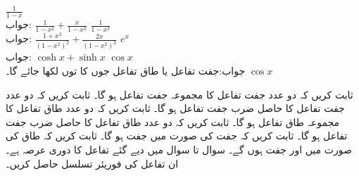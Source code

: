 \quad
$\tfrac{1}{1-x}$\\
جواب:\quad
$\tfrac{1}{1-x^2}+\tfrac{x}{1-x^2}$
$\tfrac{1}{1-x^2}$\\
جواب:\quad
$\frac{1+x^2}{(1-x^2)^2}+\frac{2x}{(1-x^2)^2}$
\quad 
$e^x$\\
جواب:\quad
$\cosh x+\sinh x$
\quad
$\cos x$\\
جواب:\quad جفت تفاعل یا طاق تفاعل جوں کا توں لکھا جائے گا۔\quad
$\cos x$

\quad 
ثابت کریں کہ دو عدد جفت تفاعل کا مجموعہ جفت تفاعل ہو گا۔
\quad 
ثابت کریں کہ دو عدد جفت تفاعل کا حاصل ضرب جفت تفاعل ہو گا۔
\quad 
ثابت کریں کہ دو عدد طاق تفاعل کا مجموعہ طاق تفاعل ہو گا۔
\quad 
ثابت کریں کہ دو عدد طاق تفاعل کا حاصل ضرب جفت تفاعل ہو گا۔
\quad
ثابت کریں کہ جفت  کی صورت میں  جفت ہو گا۔
\quad
ثابت کریں کہ طاق  کی صورت میں  اور  جفت ہوں گے۔
سوال  تا سوال  میں دیے گئے تفاعل کا دوری عرصہ  ہے۔ان تفاعل کی فوریئر تسلسل حاصل کریں۔

